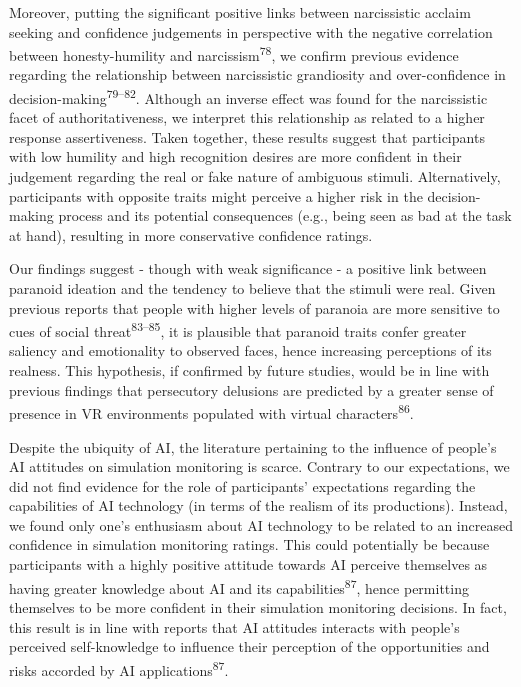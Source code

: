 \documentclass[
  man,floatsintext]{apa6}
\begin{document}
Moreover, putting the significant positive links between narcissistic acclaim seeking and confidence judgements in perspective with the negative correlation between honesty-humility and narcissism\textsuperscript{78}, we confirm previous evidence regarding the relationship between narcissistic grandiosity and over-confidence in decision-making\textsuperscript{79--82}. Although an inverse effect was found for the narcissistic facet of authoritativeness, we interpret this relationship as related to a higher response assertiveness. Taken together, these results suggest that participants with low humility and high recognition desires are more confident in their judgement regarding the real or fake nature of ambiguous stimuli. Alternatively, participants with opposite traits might perceive a higher risk in the decision-making process and its potential consequences (e.g., being seen as bad at the task at hand), resulting in more conservative confidence ratings.

Our findings suggest - though with weak significance - a positive link between paranoid ideation and the tendency to believe that the stimuli were real. Given previous reports that people with higher levels of paranoia are more sensitive to cues of social threat\textsuperscript{83--85}, it is plausible that paranoid traits confer greater saliency and emotionality to observed faces, hence increasing perceptions of its realness. This hypothesis, if confirmed by future studies, would be in line with previous findings that persecutory delusions are predicted by a greater sense of presence in VR environments populated with virtual characters\textsuperscript{86}.

Despite the ubiquity of AI, the literature pertaining to the influence of people's AI attitudes on simulation monitoring is scarce. Contrary to our expectations, we did not find evidence for the role of participants' expectations regarding the capabilities of AI technology (in terms of the realism of its productions). Instead, we found only one's enthusiasm about AI technology to be related to an increased confidence in simulation monitoring ratings. This could potentially be because participants with a highly positive attitude towards AI perceive themselves as having greater knowledge about AI and its capabilities\textsuperscript{87}, hence permitting themselves to be more confident in their simulation monitoring decisions. In fact, this result is in line with reports that AI attitudes interacts with people's perceived self-knowledge to influence their perception of the opportunities and risks accorded by AI applications\textsuperscript{87}.
\end{document}
